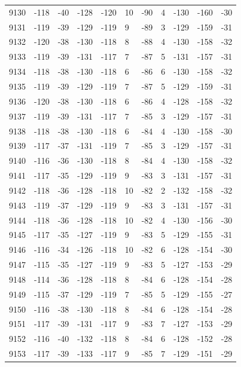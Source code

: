 \begin{table}[H]
\begin{tabular}{lllllllllll}
9130 & -118 & -40 & -128 & -120 & 10 & -90 & 4 & -130 & -160 & -30 \\
9131 & -119 & -39 & -129 & -119 & 9 & -89 & 3 & -129 & -159 & -31 \\
9132 & -120 & -38 & -130 & -118 & 8 & -88 & 4 & -130 & -158 & -32 \\
9133 & -119 & -39 & -131 & -117 & 7 & -87 & 5 & -131 & -157 & -31 \\
9134 & -118 & -38 & -130 & -118 & 6 & -86 & 6 & -130 & -158 & -32 \\
9135 & -119 & -39 & -129 & -119 & 7 & -87 & 5 & -129 & -159 & -31 \\
9136 & -120 & -38 & -130 & -118 & 6 & -86 & 4 & -128 & -158 & -32 \\
9137 & -119 & -39 & -131 & -117 & 7 & -85 & 3 & -129 & -157 & -31 \\
9138 & -118 & -38 & -130 & -118 & 6 & -84 & 4 & -130 & -158 & -30 \\
9139 & -117 & -37 & -131 & -119 & 7 & -85 & 3 & -129 & -157 & -31 \\
9140 & -116 & -36 & -130 & -118 & 8 & -84 & 4 & -130 & -158 & -32 \\
9141 & -117 & -35 & -129 & -119 & 9 & -83 & 3 & -131 & -157 & -31 \\
9142 & -118 & -36 & -128 & -118 & 10 & -82 & 2 & -132 & -158 & -32 \\
9143 & -119 & -37 & -129 & -119 & 9 & -83 & 3 & -131 & -157 & -31 \\
9144 & -118 & -36 & -128 & -118 & 10 & -82 & 4 & -130 & -156 & -30 \\
9145 & -117 & -35 & -127 & -119 & 9 & -83 & 5 & -129 & -155 & -31 \\
9146 & -116 & -34 & -126 & -118 & 10 & -82 & 6 & -128 & -154 & -30 \\
9147 & -115 & -35 & -127 & -119 & 9 & -83 & 5 & -127 & -153 & -29 \\
9148 & -114 & -36 & -128 & -118 & 8 & -84 & 6 & -128 & -154 & -28 \\
9149 & -115 & -37 & -129 & -119 & 7 & -85 & 5 & -129 & -155 & -27 \\
9150 & -116 & -38 & -130 & -118 & 8 & -84 & 6 & -128 & -154 & -28 \\
9151 & -117 & -39 & -131 & -117 & 9 & -83 & 7 & -127 & -153 & -29 \\
9152 & -116 & -40 & -132 & -118 & 8 & -84 & 6 & -128 & -152 & -28 \\
9153 & -117 & -39 & -133 & -117 & 9 & -85 & 7 & -129 & -151 & -29 \\

\end{tabular}
\end{table}
